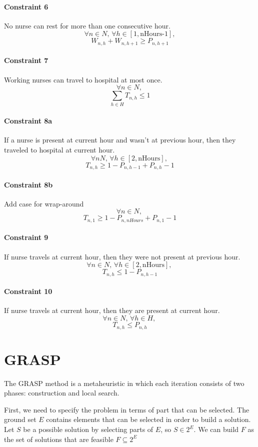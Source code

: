 \documentclass[12pt,a4paper]{article}
\begin{document}
\paragraph{Constraint 6} No nurse can rest for more than one consecutive hour.
$$ \forall n \in N,\, \forall h \in [1, \textrm{nHours-1}],$$
$$W_{n, h} + W_{n, h+1} \ge P_{n,h+1} $$
%
\paragraph{Constraint 7} Working nurses can travel to hospital at most once.
$$ \forall n \in N,\,$$
$$ \sum_{h \in H} T_{n,h} \le 1 $$
%
\paragraph{Constraint 8a} If a nurse is present at current hour and wasn't at
previous hour, then they traveled to hospital at current hour.
$$ \forall n N, \,\forall h \in [2, \textrm{nHours}],\,$$
$$ T_{n,h} \ge 1 - P_{n, h-1} + P_{n, h} - 1 $$
%
\paragraph{Constraint 8b} Add case for wrap-around
$$ \forall n \in N,\,$$
$$ T_{n, 1} \ge 1 - P_{n, nHours} + P_{n, 1} - 1 $$
%
\paragraph{Constraint 9} If nurse travels at current hour, then they were not
present at previous hour.
$$ \forall n \in N,\,\forall h \in [2, \textrm{nHours}],\,$$
$$ T_{n,h} \le 1 - P_{n, h-1} $$
%
\paragraph{Constraint 10} If nurse travels at current hour, then they are
present at current hour.
$$ \forall n \in N,\,\forall h \in H,\,$$
$$ T_{n,h} \le P_{n, h} $$
%
%
\section{GRASP}
%
The GRASP method is a metaheuristic in which each iteration consists of two
phases: construction and local search.

First, we need to specify the problem in terms of part that can be selected. The
ground set $E$ contains elements that can be selected in order to build a
solution. Let $S$ be a possible solution by selecting parts of $E$, so $S \in
2^E$. We can build $F$ as the set of solutions that are feasible $F \subseteq
2^E$
\end{document}
